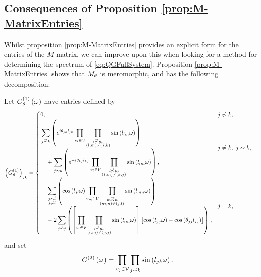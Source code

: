 \subsection{Consequences of Proposition \ref{prop:M-MatrixEntries}} \label{ssec:MMatrixConsequences}
Whilst proposition \ref{prop:M-MatrixEntries} provides an explicit form for the entries of the $M$-matrix, we can improve upon this when looking for a method for determining the spectrum of \eqref{eq:QGFullSystem}.
Proposition \ref{prop:M-MatrixEntries} shows that $M_\theta$ is meromorphic, and has the following decomposition:
\begin{cory} \label{cory:M-MatrixEntriesNoPoles}
	Let $G^{(1)}_\theta\left( \omega \right)$ have entries defined by
	\begin{align*}
		\bracs{G^{(1)}_\qm}_{jk} &= 
		\begin{cases}
			\!\begin{aligned}
				&0,
			\end{aligned}			
			& j \not\con k, \\
			\!\begin{aligned}
				&\sum_{j\conLeft k} \bracs{ e^{i\qm_{jk}l_{jk}} \prod_{v_l\in\vertSet}\prod_{\substack{ l\conLeft m \\ \bracs{l,m} \neq \bracs{j,k} }}\sin\bracs{l_{lm}\omega} }
				\\ &\quad + \sum_{j\conRight k} \bracs{ e^{-i\qm_{kj}l_{kj}} \prod_{v_l\in\vertSet}\prod_{\substack{l\conLeft m \\ \bracs{l,m} \neq \bracs{k,j} }}\sin\bracs{l_{lm}\omega} },
			\end{aligned}
			& j\neq k, \ j\con k, \\
			\!\begin{aligned}
				&- \sum_{\substack{j\con l \\ j\neq l}} \bracs{ \cos\bracs{l_{jl}\omega}\prod_{v_m\in\vertSet}\prod_{\substack{ m\conLeft n \\ \bracs{m,n}\neq\bracs{j,l} }}\sin\bracs{l_{mn}\omega} }
				\\ &\quad - 2\sum_{j\conLeft j} \bracs{ \sqbracs{ \prod_{v_l\in\vertSet}\prod_{\substack{l\conLeft m \\ \bracs{l,m}\neq\bracs{j,j} }}\sin\bracs{l_{lm}\omega} }\bigl[ \cos\bracs{l_{jj}\omega} - \cos\bracs{\qm_{jj}l_{jj}} \bigr] },
			\end{aligned}
			& j=k,
		\end{cases}
	\end{align*}
	and set
	\begin{align*}
		G^{(2)}\bracs{\omega} &= \prod_{v_j\in\vertSet} \prod_{j\conLeft k}\sin\bracs{l_{jk}\omega}.

\end{align*}
\end{cory}
